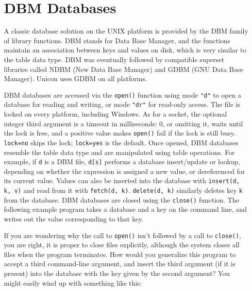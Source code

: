 \section{DBM Databases}

A classic database solution on the UNIX platform is provided by the DBM
family of library functions. DBM stands for Data Base
Manager, and the functions maintain an association between keys and
values on disk, which is very similar to the table data type. DBM was
eventually followed by compatible superset libraries called NDBM (New
Data Base Manager) and GDBM (GNU Data Base Manager). Unicon uses GDBM
on all platforms.

DBM databases are accessed via the \texttt{open()} function using mode
\texttt{"d"} to open a database for reading and writing, or mode
\texttt{"dr"} for read-only access. The file is locked on every
platform, including Windows. As for a socket, the optional integer
third argument is a timeout in milliseconds: 0, or omitting it, waits
until the lock is free, and a positive value makes \texttt{open()}
fail if the lock is still busy. \texttt{lock=no} skips the lock;
\texttt{lock=yes} is the default. Once opened, DBM databases
resemble the table data type and are manipulated using table
operations. For example, if \texttt{d} is a DBM file,
\texttt{d[s]} performs a database
insert/update or lookup, depending on whether the expression is
assigned a new value, or dereferenced for its
current value. Values can also be
inserted into the database with \texttt{insert(d, k, v)} and read from it with
\texttt{fetch(d, k)}. \texttt{delete(d, k)} similarly deletes key \texttt{k} from
the database. DBM databases are closed using the \texttt{close()}
function. The following example program takes a database and a key on
the command line, and writes out the value corresponding to that key.


If you are wondering why the call to \texttt{open()}
isn't followed by a call to \texttt{close()}, you are
right, it is proper to close files explicitly, although the system
closes all files when the program terminates. How would you generalize
this program to accept a third command-line argument, and insert the
third argument (if it is present) into the database with the key given
by the second argument? You might easily wind up with something like
this:

